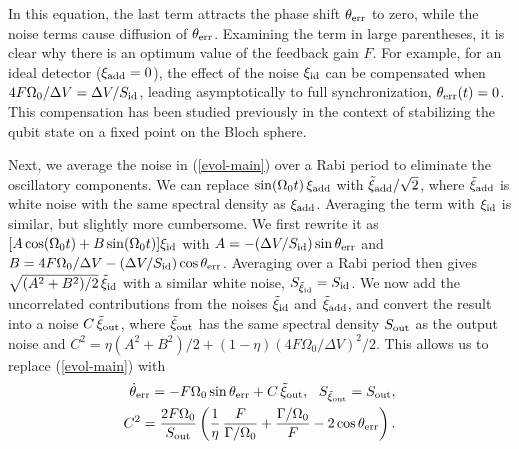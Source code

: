In this equation, the last term attracts the phase shift $\theta_{\rm err}$ to zero, while the noise terms cause diffusion of $\theta_{\rm err}$. Examining the term in large parentheses, it is clear why there is an optimum value of the feedback gain $F$. For example, for an ideal detector ($\xi_{\rm add}=0$), the effect of the noise $\xi_{\rm id}$ can be compensated when $4F\Omega_0/\Delta V = \Delta V/S_{\rm id}$, leading asymptotically to full synchronization, $\theta_{\rm err}(t)=0$. This compensation has been studied previously \cite{Hofmann_qcontrol,state_stable} in the context of stabilizing the qubit state on a fixed point on the Bloch sphere.

Next, we average the noise in (\ref{evol-main}) over a Rabi period to eliminate the oscillatory components. We can replace $\sin (\Omega_0 t)\,\xi_{\rm add}$ with $\tilde\xi_{\rm add}/\sqrt{2}$, where $\tilde\xi_{\rm add}$ is white noise with the same spectral density as $\xi_{\rm add}$. Averaging the term with $\xi_{\rm id}$ is similar, but slightly more cumbersome. We first rewrite it as $[A\cos (\Omega_0 t)+B\sin(\Omega_0 t)]\xi_{\rm id}$ with $A=-(\Delta V/S_{\rm id})\sin\theta_{\rm err}$ and $B=4F\Omega_0/\Delta V -(\Delta V/S_{\rm id})\cos\theta_{\rm err}$. Averaging over a Rabi period then gives $\sqrt{(A^2+B^2)/2} \, \tilde\xi_{\rm id}$ with a similar white noise, $S_{\tilde{\xi}_{\rm id}}=S_{\rm id}$. We now add the uncorrelated contributions from the noises $\tilde\xi_{\rm id}$ and $\tilde\xi_{\rm add}$, and convert the result into a noise $C\,\tilde\xi_{\rm out}$, where $\tilde\xi_{\rm out}$ has the same spectral density $S_{\rm out}$ as the output noise and $C^2=\eta(A^2+B^2)/2+(1-\eta)(4F\Omega_0/\Delta V)^2/2$. This allows us to replace (\ref{evol-main}) with
\begin{align}
\dot\theta_{\rm err} =  -F\Omega_0 \sin\theta_{\rm err} + C \, \tilde \xi_{\rm out}, \,\,\,\, S_{\tilde \xi_{\rm out}}= S_{\rm out} , \label{evol-eff}\\
C^2= \frac{2F\Omega_0}{S_{\rm out}} \left( \frac{1}{\eta}\, \frac{F}{\Gamma/\Omega_0} +\frac{\Gamma/\Omega_0}{F}-2\cos\theta_{\rm err} \right) .
\label{C-def}
\end{align}

